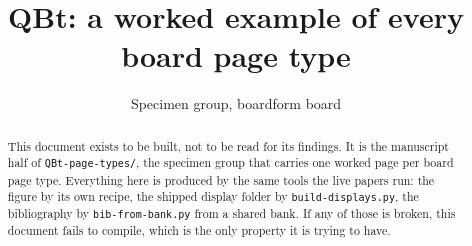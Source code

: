 \documentclass[11pt]{article}
\title{QBt: a worked example of every board page type}
\author{Specimen group, boardform board}
\date{}
\begin{document}
\maketitle

\begin{abstract}
This document exists to be built, not to be read for its findings. It is the
manuscript half of \texttt{QBt-page-types/}, the specimen group that carries one
worked page per board page type. Everything here is produced by the same tools
the live papers run: the figure by its own recipe, the shipped display folder by
\texttt{build-displays.py}, the bibliography by \texttt{bib-from-bank.py} from a
shared bank. If any of those is broken, this document fails to compile, which is
the only property it is trying to have.
\end{abstract}






\end{document}
